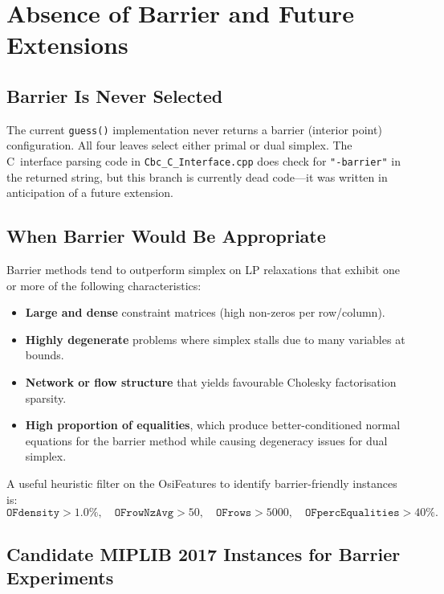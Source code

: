 \documentclass[11pt,a4paper]{article}
\begin{document}
\section{Absence of Barrier and Future Extensions}

\subsection{Barrier Is Never Selected}

The current \texttt{guess()} implementation never returns a barrier
(interior point) configuration.  All four leaves select either primal or
dual simplex.  The C~interface parsing code in
\texttt{Cbc\_C\_Interface.cpp} does check for \texttt{"-barrier"} in the
returned string, but this branch is currently dead code---it was written in
anticipation of a future extension.

\subsection{When Barrier Would Be Appropriate}

Barrier methods tend to outperform simplex on LP relaxations that exhibit
one or more of the following characteristics:

\begin{itemize}
  \item \textbf{Large and dense} constraint matrices (high non-zeros per
        row/column).
  \item \textbf{Highly degenerate} problems where simplex stalls due to
        many variables at bounds.
  \item \textbf{Network or flow structure} that yields favourable Cholesky
        factorisation sparsity.
  \item \textbf{High proportion of equalities}, which produce
        better-conditioned normal equations for the barrier method while
        causing degeneracy issues for dual simplex.
\end{itemize}

A useful heuristic filter on the OsiFeatures to identify barrier-friendly
instances is:
\[
  \texttt{OFdensity} > 1.0\%, \quad
  \texttt{OFrowNzAvg} > 50, \quad
  \texttt{OFrows} > 5000, \quad
  \texttt{OFpercEqualities} > 40\%.
\]

\subsection{Candidate MIPLIB 2017 Instances for Barrier Experiments}
\end{document}
